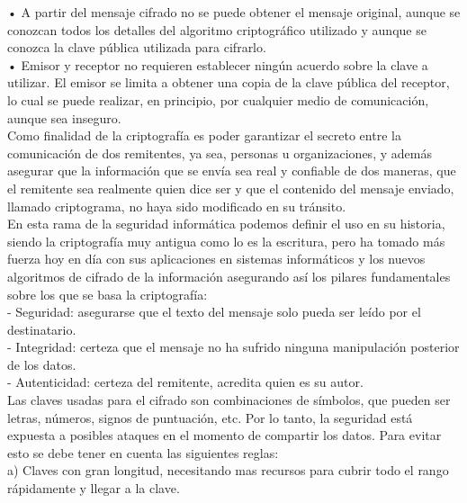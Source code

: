 \documentclass[9pt,24pt,twocolumn]{article}
\begin{document}
{• A partir del mensaje cifrado no se puede obtener el mensaje original, aunque se conozcan todos los detalles del algoritmo criptográfico utilizado y aunque se conozca la clave pública utilizada para cifrarlo.}
\\

{• Emisor y receptor no requieren establecer ningún acuerdo sobre la clave a utilizar. El emisor se limita a obtener una copia de la clave pública del receptor, lo cual se puede realizar, en principio, por cualquier medio de comunicación, aunque sea inseguro.}
\\

{Como finalidad de la criptografía es poder garantizar el secreto entre la comunicación de dos remitentes, ya sea, personas u organizaciones, y además asegurar que la información que se envía sea real y confiable de dos maneras, que el remitente sea realmente quien dice ser y que el contenido del mensaje enviado, llamado criptograma, no haya sido modificado en su tránsito.}
\\

{En esta rama de la seguridad informática podemos definir el uso en su historia, siendo la criptografía muy antigua como lo es la escritura, pero ha tomado más fuerza hoy en día con sus aplicaciones en sistemas informáticos y los nuevos algoritmos de cifrado de la información asegurando así los pilares fundamentales sobre los que se basa la criptografía:}
\\

{-	Seguridad: asegurarse que el texto del mensaje solo pueda ser leído por el destinatario.}
\\

{-	Integridad: certeza que el mensaje no ha sufrido ninguna manipulación posterior de los datos.}
\\

{-	Autenticidad: certeza del remitente, acredita quien es su autor.}
\\

{Las claves usadas para el cifrado son combinaciones de símbolos, que pueden ser letras, números, signos de puntuación, etc. Por lo tanto, la seguridad está expuesta a posibles ataques en el momento de compartir los datos. Para evitar esto se debe tener en cuenta las siguientes reglas:}
\\

{a) Claves con gran longitud, necesitando mas recursos para cubrir todo el rango rápidamente y llegar a la clave.}
\\
\end{document}
